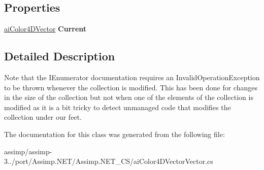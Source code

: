\subsection*{Properties}
\begin{DoxyCompactItemize}
\item 
\hypertarget{classai_color4_d_vector_vector_1_1ai_color4_d_vector_vector_enumerator_a562e82b01807a31a269eb5c57804a1fd}{\hyperlink{classai_color4_d_vector}{ai\+Color4\+D\+Vector} {\bfseries Current}}\label{classai_color4_d_vector_vector_1_1ai_color4_d_vector_vector_enumerator_a562e82b01807a31a269eb5c57804a1fd}

\end{DoxyCompactItemize}


\subsection{Detailed Description}
Note that the I\+Enumerator documentation requires an Invalid\+Operation\+Exception to be thrown whenever the collection is modified. This has been done for changes in the size of the collection but not when one of the elements of the collection is modified as it is a bit tricky to detect unmanaged code that modifies the collection under our feet. 

The documentation for this class was generated from the following file\+:\begin{DoxyCompactItemize}
\item 
assimp/assimp-\/3../port/\+Assimp.\+N\+E\+T/\+Assimp.\+N\+E\+T\+\_\+\+C\+S/ai\+Color4\+D\+Vector\+Vector.\+cs\end{DoxyCompactItemize}
